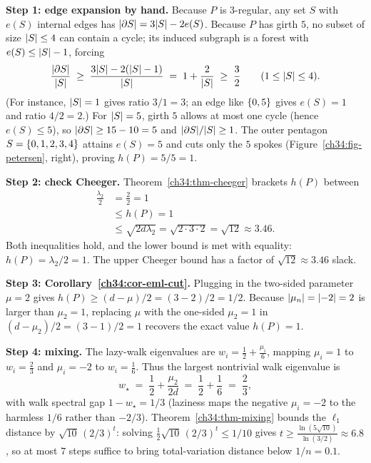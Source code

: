 \textbf{Step 1: edge expansion by hand.} Because $P$ is $3$-regular, any set $S$ with $e(S)$ internal edges has $\lvert\partial S\rvert = 3\lvert S\rvert - 2e(S)$. Because $P$ has girth $5$, no subset of size $\lvert S\rvert\le 4$ can contain a cycle; its induced subgraph is a forest with $e(S)\le \lvert S\rvert-1$, forcing
\[
  \frac{\lvert\partial S\rvert}{\lvert S\rvert} \;\ge\; \frac{3\lvert S\rvert-2(\lvert S\rvert-1)}{\lvert S\rvert} \;=\; 1 + \frac{2}{\lvert S\rvert} \;\ge\; \frac{3}{2} \qquad (1\le\lvert S\rvert\le 4).
\]
(For instance, $\lvert S\rvert=1$ gives ratio $3/1=3$; an edge like $\{0,5\}$ gives $e(S)=1$ and ratio $4/2=2$.) For $\lvert S\rvert=5$, girth $5$ allows at most one cycle (hence $e(S)\le 5$), so $\lvert\partial S\rvert\ge 15-10=5$ and $\lvert\partial S\rvert/\lvert S\rvert\ge 1$. The outer pentagon $S=\{0,1,2,3,4\}$ attains $e(S)=5$ and cuts only the $5$ spokes (Figure~\ref{ch34:fig-petersen}, right), proving $h(P)=5/5=1$.

\textbf{Step 2: check Cheeger.} Theorem~\ref{ch34:thm-cheeger} brackets $h(P)$ between
\begin{align*}
  \frac{\lambda_2}{2} &= \frac{2}{2} = 1 \\
  &\le h(P) = 1 \\
  &\le \sqrt{2d\lambda_2} = \sqrt{2\cdot 3\cdot 2} = \sqrt{12} \approx 3.46.
\end{align*}
Both inequalities hold, and the lower bound is met with equality: $h(P)=\lambda_2/2=1$. The upper Cheeger bound has a factor of $\sqrt{12}\approx 3.46$ slack.

\textbf{Step 3: Corollary~\ref{ch34:cor-eml-cut}.} Plugging in the two-sided parameter $\mu=2$ gives $h(P)\ge(d-\mu)/2=(3-2)/2=1/2$. Because $\lvert\mu_n\rvert=\lvert-2\rvert=2$ is larger than $\mu_2=1$, replacing $\mu$ with the one-sided $\mu_2=1$ in $(d-\mu_2)/2=(3-1)/2=1$ recovers the exact value $h(P)=1$.

\textbf{Step 4: mixing.} The lazy-walk eigenvalues are $w_i=\frac{1}{2}+\frac{\mu_i}{6}$, mapping $\mu_i=1$ to $w_i=\frac{2}{3}$ and $\mu_i=-2$ to $w_i=\frac{1}{6}$. Thus the largest nontrivial walk eigenvalue is
\[
  w_\star \;=\; \frac{1}{2}+\frac{\mu_2}{2d} \;=\; \frac{1}{2}+\frac{1}{6} \;=\; \frac{2}{3},
\]
with walk spectral gap $1-w_\star = 1/3$ (laziness maps the negative $\mu_i=-2$ to the harmless $1/6$ rather than $-2/3$). Theorem~\ref{ch34:thm-mixing} bounds the $\ell_1$ distance by $\sqrt{10}\,(2/3)^t$: solving $\frac{1}{2}\sqrt{10}\,(2/3)^t \le 1/10$ gives $t \ge \frac{\ln(5\sqrt{10})}{\ln(3/2)} \approx 6.8$, so at most $7$ steps suffice to bring total-variation distance below $1/n=0.1$.

